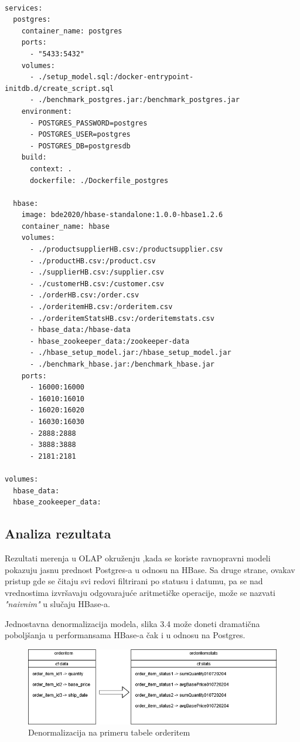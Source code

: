\documentclass[12pt,oneside]{memoir}
\begin{document}
\begin{lstlisting}[title={docker-compose.yml},captionpos=t]

services: 
  postgres:
    container_name: postgres
    ports:
      - "5433:5432"
    volumes:
      - ./setup_model.sql:/docker-entrypoint-initdb.d/create_script.sql
      - ./benchmark_postgres.jar:/benchmark_postgres.jar
    environment:
      - POSTGRES_PASSWORD=postgres
      - POSTGRES_USER=postgres
      - POSTGRES_DB=postgresdb
    build:
      context: .
      dockerfile: ./Dockerfile_postgres

  hbase:
    image: bde2020/hbase-standalone:1.0.0-hbase1.2.6
    container_name: hbase
    volumes:
      - ./productsupplierHB.csv:/productsupplier.csv
      - ./productHB.csv:/product.csv
      - ./supplierHB.csv:/supplier.csv
      - ./customerHB.csv:/customer.csv
      - ./orderHB.csv:/order.csv
      - ./orderitemHB.csv:/orderitem.csv
      - ./orderitemStatsHB.csv:/orderitemstats.csv
      - hbase_data:/hbase-data
      - hbase_zookeeper_data:/zookeeper-data
      - ./hbase_setup_model.jar:/hbase_setup_model.jar
      - ./benchmark_hbase.jar:/benchmark_hbase.jar
    ports:
      - 16000:16000
      - 16010:16010
      - 16020:16020
      - 16030:16030
      - 2888:2888
      - 3888:3888
      - 2181:2181

volumes:
  hbase_data:
  hbase_zookeeper_data:
\end{lstlisting}


\subsection{Analiza rezultata}

Rezultati merenja u OLAP okruženju ,kada se koriste ravnopravni modeli pokazuju jasnu prednost Postgres-a u odnosu na HBase. Sa druge strane, ovakav pristup gde se čitaju svi redovi filtrirani po statusu i datumu, pa se nad vrednostima izvršavaju odgovarajuće aritmetičke operacije, može se nazvati \textit{"naivnim"} u slučaju HBase-a. 

Jednostavna denormalizacija modela, slika 3.4 može doneti dramatična poboljšanja u performansama HBase-a čak i u odnosu na Postgres.

\begin{figure}[!ht]
  \centering
  \includegraphics[width=1\textwidth]{denormalized-model.png}
  \caption{Denormalizacija na primeru tabele orderitem}
  \label{fig:grafikon}
\end{figure}
\end{document}

